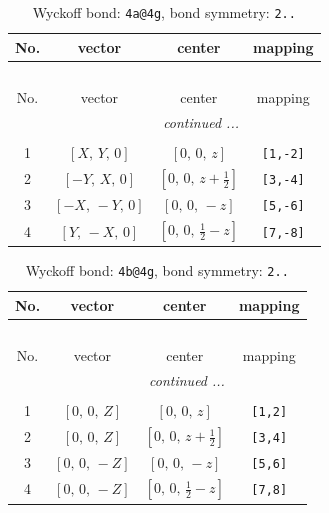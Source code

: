 \documentclass[fleqn,8pt]{jsarticle}
\begin{document}
\begin{longtable}{cccc}
\caption{Wyckoff bond: {\tt 4a@4g}, bond symmetry: {\tt 2..}}
 \\
 \hline \hline
No. & vector & center & mapping \\ \hline \endfirsthead

\multicolumn{3}{l}{\tablename\ \thetable{}} \\
 \hline \hline
No. & vector & center & mapping \\ \hline \endhead

 \hline \hline
\multicolumn{3}{r}{\footnotesize\it continued ...} \\ \endfoot

 \hline \hline
\multicolumn{3}{r}{} \\ \endlastfoot

1 & $\left[ X,\, Y,\, 0 \right]$ & $\left[ 0,\, 0,\, z \right]$ & {\tt [1,-2]} \\ \hline
2 & $\left[ - Y,\, X,\, 0 \right]$ & $\left[ 0,\, 0,\, z + \frac{1}{2} \right]$ & {\tt [3,-4]} \\ \hline
3 & $\left[ - X,\, - Y,\, 0 \right]$ & $\left[ 0,\, 0,\, - z \right]$ & {\tt [5,-6]} \\ \hline
4 & $\left[ Y,\, - X,\, 0 \right]$ & $\left[ 0,\, 0,\, \frac{1}{2} - z \right]$ & {\tt [7,-8]} \\
\end{longtable}
\renewcommand{\arraystretch}{1.2}
\begin{longtable}{cccc}
\caption{Wyckoff bond: {\tt 4b@4g}, bond symmetry: {\tt 2..}}
 \\
 \hline \hline
No. & vector & center & mapping \\ \hline \endfirsthead

\multicolumn{3}{l}{\tablename\ \thetable{}} \\
 \hline \hline
No. & vector & center & mapping \\ \hline \endhead

 \hline \hline
\multicolumn{3}{r}{\footnotesize\it continued ...} \\ \endfoot

 \hline \hline
\multicolumn{3}{r}{} \\ \endlastfoot

1 & $\left[ 0,\, 0,\, Z \right]$ & $\left[ 0,\, 0,\, z \right]$ & {\tt [1,2]} \\ \hline
2 & $\left[ 0,\, 0,\, Z \right]$ & $\left[ 0,\, 0,\, z + \frac{1}{2} \right]$ & {\tt [3,4]} \\ \hline
3 & $\left[ 0,\, 0,\, - Z \right]$ & $\left[ 0,\, 0,\, - z \right]$ & {\tt [5,6]} \\ \hline
4 & $\left[ 0,\, 0,\, - Z \right]$ & $\left[ 0,\, 0,\, \frac{1}{2} - z \right]$ & {\tt [7,8]} \\
\end{longtable}
\end{document}
